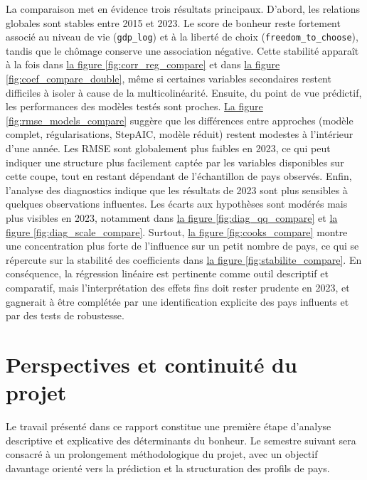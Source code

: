 \documentclass{article}
\begin{document}
La comparaison met en évidence trois résultats principaux.
D’abord, les relations globales sont stables entre 2015 et 2023.
Le score de bonheur reste fortement associé au niveau de vie (\texttt{gdp\_log}) et à la liberté de choix (\texttt{freedom\_to\_choose}), tandis que le chômage conserve une association négative.
Cette stabilité apparaît à la fois dans \hyperref[fig:corr_reg_compare]{la figure \ref{fig:corr_reg_compare}} et dans \hyperref[fig:coef_compare_double]{la figure \ref{fig:coef_compare_double}}, même si certaines variables secondaires restent difficiles à isoler à cause de la multicolinéarité.
Ensuite, du point de vue prédictif, les performances des modèles testés sont proches.
\hyperref[fig:rmse_models_compare]{La figure \ref{fig:rmse_models_compare}} suggère que les différences entre approches (modèle complet, régularisations, StepAIC, modèle réduit) restent modestes à l’intérieur d’une année.
Les RMSE sont globalement plus faibles en 2023, ce qui peut indiquer une structure plus facilement captée par les variables disponibles sur cette coupe, tout en restant dépendant de l’échantillon de pays observés.
Enfin, l’analyse des diagnostics indique que les résultats de 2023 sont plus sensibles à quelques observations influentes.
Les écarts aux hypothèses sont modérés mais plus visibles en 2023, notamment dans \hyperref[fig:diag_qq_compare]{la figure \ref{fig:diag_qq_compare}} et \hyperref[fig:diag_scale_compare]{la figure \ref{fig:diag_scale_compare}}.
Surtout, \hyperref[fig:cooks_compare]{la figure \ref{fig:cooks_compare}} montre une concentration plus forte de l’influence sur un petit nombre de pays, ce qui se répercute sur la stabilité des coefficients dans \hyperref[fig:stabilite_compare]{la figure \ref{fig:stabilite_compare}}.
En conséquence, la régression linéaire est pertinente comme outil descriptif et comparatif, mais l’interprétation des effets fins doit rester prudente en 2023, et gagnerait à être complétée par une identification explicite des pays influents et par des tests de robustesse.

\newpage
\section{Perspectives et continuité du projet}

Le travail présenté dans ce rapport constitue une première étape d’analyse descriptive et explicative des déterminants du bonheur.
Le semestre suivant sera consacré à un prolongement méthodologique du projet, avec un objectif davantage orienté vers la prédiction et la structuration des profils de pays.
\end{document}
